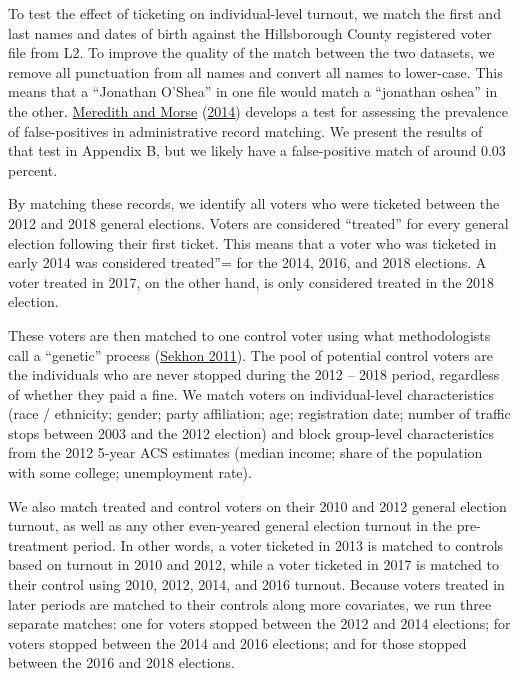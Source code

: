 \documentclass[
  12pt,
]{article}
\begin{document}
To test the effect of ticketing on individual-level turnout, we match the first and last names and dates of birth against the Hillsborough County registered voter file from L2. To improve the quality of the match between the two datasets, we remove all punctuation from all names and convert all names to lower-case. This means that a ``Jonathan O'Shea'' in one file would match a ``jonathan oshea'' in the other. \protect\hyperlink{ref-Meredith2014}{Meredith and Morse} (\protect\hyperlink{ref-Meredith2014}{2014}) develops a test for assessing the prevalence of false-positives in administrative record matching. We present the results of that test in Appendix B, but we likely have a false-positive match of around 0.03 percent.

By matching these records, we identify all voters who were ticketed between the 2012 and 2018 general elections. Voters are considered ``treated'' for every general election following their first ticket. This means that a voter who was ticketed in early 2014 was considered treated''= for the 2014, 2016, and 2018 elections. A voter treated in 2017, on the other hand, is only considered treated in the 2018 election.

These voters are then matched to one control voter using what methodologists call a ``genetic'' process (\protect\hyperlink{ref-Sekhon2011}{Sekhon 2011}). The pool of potential control voters are the individuals who are never stopped during the 2012 -- 2018 period, regardless of whether they paid a fine. We match voters on individual-level characteristics (race / ethnicity; gender; party affiliation; age; registration date; number of traffic stops between 2003 and the 2012 election) and block group-level characteristics from the 2012 5-year ACS estimates (median income; share of the population with some college; unemployment rate).

We also match treated and control voters on their 2010 and 2012 general election turnout, as well as any other even-yeared general election turnout in the pre-treatment period. In other words, a voter ticketed in 2013 is matched to controls based on turnout in 2010 and 2012, while a voter ticketed in 2017 is matched to their control using 2010, 2012, 2014, and 2016 turnout. Because voters treated in later periods are matched to their controls along more covariates, we run three separate matches: one for voters stopped between the 2012 and 2014 elections; for voters stopped between the 2014 and 2016 elections; and for those stopped between the 2016 and 2018 elections.
\end{document}
